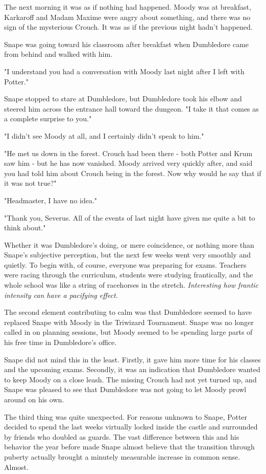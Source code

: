 \documentclass[a4paper,11pt]{article}
\begin{document}
The next morning it was as if nothing had happened. Moody was at breakfast, Karkaroff and Madam Maxime were angry about something, and there was no sign of the mysterious Crouch. It was as if the previous night hadn't happened.

Snape was going toward his classroom after breakfast when Dumbledore came from behind and walked with him.

"I understand you had a conversation with Moody last night after I left with Potter."

Snape stopped to stare at Dumbledore, but Dumbledore took his elbow and steered him across the entrance hall toward the dungeon. "I take it that comes as a complete surprise to you."

"I didn't see Moody at all, and I certainly didn't speak to him."

"He met us down in the forest. Crouch had been there - both Potter and Krum saw him - but he has now vanished. Moody arrived very quickly after, and said you had told him about Crouch being in the forest. Now why would he say that if it was not true?"

"Headmaster, I have no idea."

"Thank you, Severus. All of the events of last night have given me quite a bit to think about."

Whether it was Dumbledore's doing, or mere coincidence, or nothing more than Snape's subjective perception, but the next few weeks went very smoothly and quietly. To begin with, of course, everyone was preparing for exams. Teachers were racing through the curriculum, students were studying frantically, and the whole school was like a string of racehorses in the stretch. \emph{Interesting how frantic intensity can have a pacifying effect.}

The second element contributing to calm was that Dumbledore seemed to have replaced Snape with Moody in the Triwizard Tournament. Snape was no longer called in on planning sessions, but Moody seemed to be spending large parts of his free time in Dumbledore's office.

Snape did not mind this in the least. Firstly, it gave him more time for his classes and the upcoming exams. Secondly, it was an indication that Dumbledore wanted to keep Moody on a close leash. The missing Crouch had not yet turned up, and Snape was pleased to see that Dumbledore was not going to let Moody prowl around on his own.

The third thing was quite unexpected. For reasons unknown to Snape, Potter decided to spend the last weeks virtually locked inside the castle and surrounded by friends who doubled as guards. The vast difference between this and his behavior the year before made Snape almost believe that the transition through puberty actually brought a minutely measurable increase in common sense. Almost.
\end{document}
